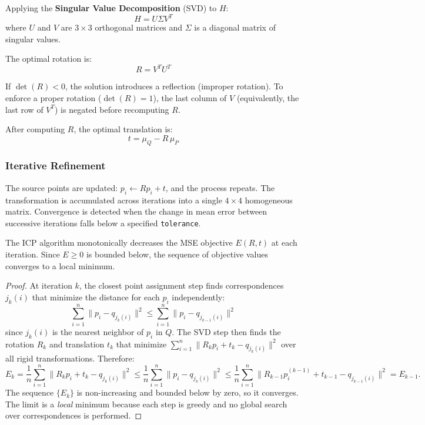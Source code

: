 Applying the \textbf{Singular Value Decomposition} (SVD) to $H$:
$$H = U \Sigma V^T$$
where $U$ and $V$ are $3 \times 3$ orthogonal matrices and $\Sigma$ is a diagonal matrix of singular values.

The optimal rotation is:
$$R = V^T U^T$$

\begin{theorem}\label{thm:icp_reflection}
If $\det(R) < 0$, the solution introduces a reflection (improper rotation). To enforce a proper rotation ($\det(R) = 1$), the last column of $V$ (equivalently, the last row of $V^T$) is negated before recomputing $R$.
\end{theorem}

After computing $R$, the optimal translation is:
$$t = \mu_Q - R \, \mu_P$$

\subsubsection{Iterative Refinement}

The source points are updated: $p_i \leftarrow R p_i + t$, and the process repeats. The transformation is accumulated across iterations into a single $4 \times 4$ homogeneous matrix. Convergence is detected when the change in mean error between successive iterations falls below a specified \texttt{tolerance}.

\begin{theorem}\label{thm:icp_convergence}
The ICP algorithm monotonically decreases the MSE objective $E(R, t)$ at each iteration. Since $E \geq 0$ is bounded below, the sequence of objective values converges to a local minimum.
\end{theorem}

\begin{proof}
At iteration $k$, the closest point assignment step finds correspondences $j_k(i)$ that minimize the distance for each $p_i$ independently:
$$\sum_{i=1}^{n} \|p_i - q_{j_k(i)}\|^2 \leq \sum_{i=1}^{n} \|p_i - q_{j_{k-1}(i)}\|^2$$
since $j_k(i)$ is the nearest neighbor of $p_i$ in $Q$. The SVD step then finds the rotation $R_k$ and translation $t_k$ that minimize $\sum_{i=1}^{n} \|R_k p_i + t_k - q_{j_k(i)}\|^2$ over all rigid transformations. Therefore:
$$E_k = \frac{1}{n}\sum_{i=1}^{n} \|R_k p_i + t_k - q_{j_k(i)}\|^2 \leq \frac{1}{n}\sum_{i=1}^{n} \|p_i - q_{j_k(i)}\|^2 \leq \frac{1}{n}\sum_{i=1}^{n} \|R_{k-1} p_{i}^{(k-1)} + t_{k-1} - q_{j_{k-1}(i)}\|^2 = E_{k-1}.$$
The sequence $\{E_k\}$ is non-increasing and bounded below by zero, so it converges. The limit is a \textit{local} minimum because each step is greedy and no global search over correspondences is performed.
\end{proof}

